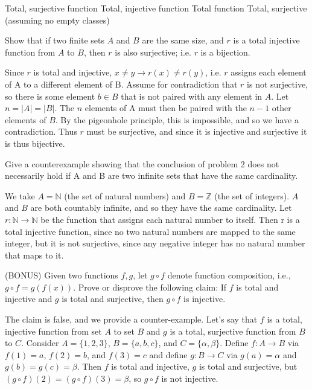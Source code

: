 \documentclass[solution, letterpaper]{cs20inclass}
\begin{document}
\begin{solution}
\subsolution Total, surjective function
\subsolution Total, injective function
\subsolution Total function
\subsolution Total, surjective (assuming no empty classes)
\end{solution}


\problem Show that if two finite sets $A$ and $B$ are the same size, and $r$ is a total injective function from $A$ to $B$, then $r$ is also surjective; i.e. $r$ is a bijection.

\begin{solution}
Since $r$ is total and injective, $x \neq y \rightarrow r(x) \neq r(y)$, i.e. $r$ assigns each element of A to a different element of B. Assume for contradiction that $r$ is not surjective, so there is some element $b \in B$ that is not paired with any element in $A$. Let $n = |A| = |B|$. The $n$ elements of A must then be paired with the $n - 1$ other elements of $B$. By the pigeonhole principle, this is impossible, and so we have a contradiction. Thus $r$ must be surjective, and since it is injective and surjective it is thus bijective.
\end{solution}


\problem Give a counterexample showing that the conclusion of problem 2 does not necessarily hold if A and B are two infinite sets that have the same cardinality.

\begin{solution}
We take $A = \mathds{N}$ (the set of natural numbers) and $B = \mathds{Z}$ (the set of integers). $A$ and $B$ are both countably infinite, and so they have the same cardinality. Let $r : \mathds{N} \rightarrow \mathds{N}$ be the function that assigns each natural number to itself. Then r is a total injective function, since no two natural numbers are mapped to the same integer, but it is not surjective, since any negative integer has no natural number that maps to it.
\end{solution}


\problem (BONUS) Given two functions $f,g$, let $g \circ f$ denote function composition, i.e., $g \circ f=g(f(x))$. Prove or disprove the following claim: If $f$ is total and injective and $g$ is total and surjective, then $g \circ f$ is injective.

\begin{solution}
The claim is false, and we provide a counter-example. Let's say that $f$ is a total, injective function from set $A$ to set $B$ and $g$ is a total, surjective function from $B$ to $C$. Consider $A=\{1,2,3\}$, $B=\{a, b, c\}$, and $C=\{\alpha, \beta\}$. Define $f: A \rightarrow B$ via $f(1)=a$, $f(2)=b$, and $f(3)=c$ and define $g: B \rightarrow C$ via $g(a)=\alpha$ and $g(b)=g(c)=\beta$. Then $f$ is total and injective, $g$ is total and surjective, but $(g \circ f)(2) = (g \circ f)(3) = \beta$, so $g \circ f$ is not injective.
\end{solution}
\end{document}
